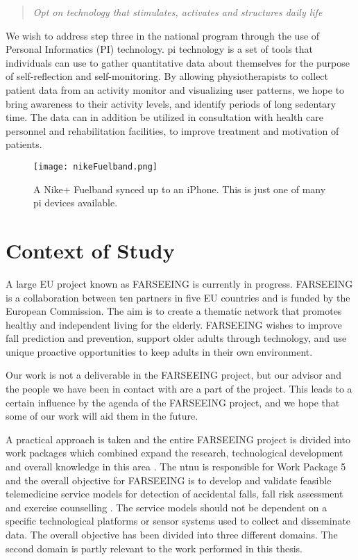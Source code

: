 \begin{quote}
\textit{Opt on technology that stimulates, activates and structures daily life}~\cite[page 120]{haagen}
\end{quote}

We wish to address step three in the national program through the use of Personal Informatics (PI) technology. \gls{pi} technology is a set of tools that individuals can use to gather quantitative data about themselves for the purpose of self-reflection and self-monitoring. By allowing physiotherapists to collect patient data from an activity monitor and visualizing user patterns, we hope to bring awareness to their activity levels, and identify periods of long sedentary time. The data can in addition be utilized in consultation with health care personnel and rehabilitation facilities, to improve treatment and motivation of patients.


\begin{figure}[h!]
	\centering
		\texttt{[image: nikeFuelband.png]}
		\caption{\footnotesize A Nike+ Fuelband synced up to an iPhone. This is just one of many \gls{pi} devices available.}
		\label{fig:nikeFuelbandPhone}
\end{figure}

\section{Context of Study}
A large EU project known as FARSEEING is currently in progress. FARSEEING is a collaboration between ten partners in five EU countries and is funded by the European Commission. The aim is to create a thematic network that promotes healthy and independent living for the elderly. FARSEEING wishes to improve fall prediction and prevention, support older adults through technology, and use unique proactive opportunities to keep adults in their own environment.

Our work is not a deliverable in the FARSEEING project, but our advisor and the people we have been in contact with are a part of the project. This leads to a certain influence by the agenda of the FARSEEING project, and we hope that some of our work will aid them in the future.

A practical approach is taken and the entire FARSEEING project is divided into work packages which combined expand the research, technological development and overall knowledge in this area \cite{farseeing}. The \gls{ntnu} is responsible for Work Package 5 and the overall objective for FARSEEING is to develop and validate feasible telemedicine service models for detection of accidental falls, fall risk assessment and exercise counselling \cite{wp5}. The service models should not be dependent on a specific technological platforms or sensor systems used to collect and disseminate data. The overall objective has been divided into three different domains. The second domain is partly relevant to the work performed in this thesis.

